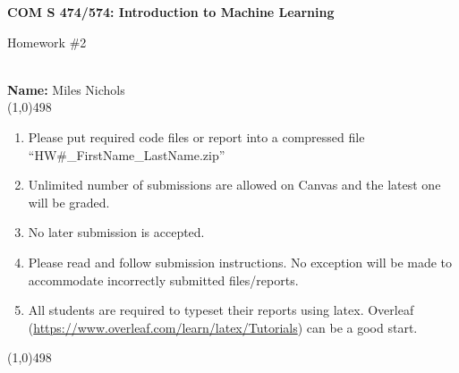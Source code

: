 \documentclass[11pt]{article}
\begin{document}
\begin{center}
{\Large \textbf{COM S 474/574: Introduction to Machine Learning}

Homework \#2}\\
\vspace{0.2cm}
\textbf{Name:} Miles Nichols\\

\linethickness{1mm}\line(1,0){498}

\begin{enumerate}
\item Please put required code files or report into a
compressed file ``HW\#\_FirstName\_LastName.zip''
\item Unlimited number of submissions are
allowed on Canvas and the latest one will be graded.
\item {\color{red} No later submission is accepted.}
\item Please read and follow submission instructions. No exception
will be made to accommodate incorrectly submitted files/reports.
\item All students are required to typeset their reports using
latex. Overleaf
(\url{https://www.overleaf.com/learn/latex/Tutorials}) can be a
good start.
\end{enumerate}

\linethickness{1mm}\line(1,0){498}

\end{center}


\end{document}

